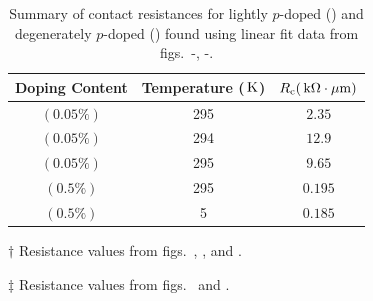 \begin{table}[ht]
	\centering
	\begin{threeparttable}
		\begin{tabular}{c c c}
			\toprule
			Doping Content & Temperature ($\,\mathrm{K}$) & $R_\mathrm{c}(\,\mathrm{k\Omega\cdot\mu m})$ \\ [0.5ex]
			\midrule
			$(0.05\%)$ \lightlyfive & 295 & $2.35$\tnote{$\dagger$}\\
			$(0.05\%)$ \lightlyfive & 294 & $12.9$\tnote{$\dagger$}\\
			$(0.05\%)$ \lightlyfive & 295 & $9.65$\tnote{$\dagger$}\\ 
			$(0.5\%)$ \degenerate & 295 & $0.195$\tnote{$\ddagger$}\\ 
			$(0.5\%)$ \degenerate & 5 & $0.185$\tnote{$\ddagger$}\\[1ex]
			\bottomrule
		\end{tabular}
		\begin{tablenotes}
			\item[$\dagger$] Resistance values from figs.~, , and .
			\item[$\ddagger$] Resistance values from figs.~ and .
		\end{tablenotes}
	\caption[Summary of contact resistances lightly $p$-doped and degenerately $p$-doped ]{Summary of contact resistances for lightly $p$-doped  (\lightlyfive) and degenerately $p$-doped  (\degenerate) found using linear fit data from figs.~-, -.}
	\label{table:contact_summary}
	\end{threeparttable}
\end{table}

